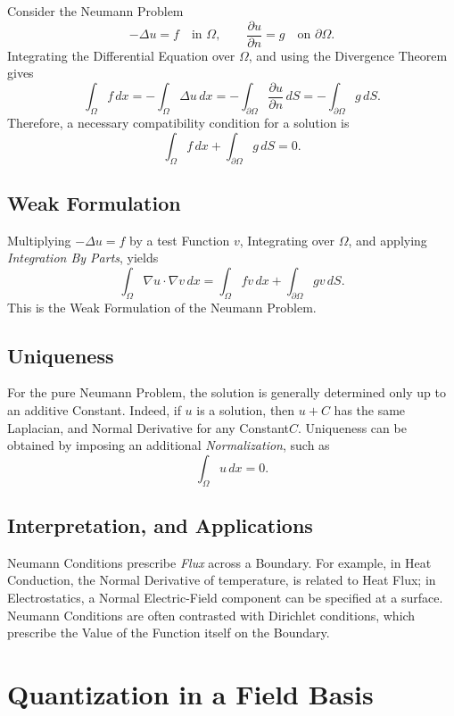 \documentclass[a4paper, 10pt, onepage]{elegantbook}
\begin{document}
Consider the Neumann Problem
\[
-\Delta u=f \quad \text{in } \Omega,
\qquad
\frac{\partial u}{\partial n}=g \quad \text{on } \partial\Omega.
\]
Integrating the Differential Equation over \(\Omega\), and using the
Divergence Theorem gives
\[
\int_\Omega f\,dx
=-\int_\Omega\Delta u\,dx
=-\int_{\partial\Omega}\frac{\partial u}{\partial n}\,dS
=-\int_{\partial\Omega}g\,dS.
\]
Therefore, a necessary compatibility condition for a solution is
\[
\boxed{
\int_\Omega f\,dx
+\int_{\partial\Omega}g\,dS=0
}.
\]

\subsection{Weak Formulation}

Multiplying \(-\Delta u=f\) by a test Function \(v\), Integrating over \(\Omega\), and applying \emph{Integration By Parts}, yields
\[
\int_\Omega \nabla u\cdot\nabla v\,dx
=
\int_\Omega f v\,dx
+\int_{\partial\Omega}g v\,dS.
\]
This is the Weak Formulation of the Neumann Problem.

\subsection{Uniqueness}

For the pure Neumann Problem, the solution is generally determined only up to an additive Constant. Indeed, if \(u\) is a solution, then
\(u+C\) has the same Laplacian, and Normal Derivative for any Constant\(C\). Uniqueness can be obtained by imposing an additional \emph{Normalization}, such as
\[
\int_\Omega u\,dx=0.
\]

\subsection{Interpretation, and Applications}

Neumann Conditions prescribe \emph{Flux} across a Boundary. For example, in Heat Conduction, the Normal Derivative of temperature, is related
to Heat Flux; in Electrostatics, a Normal Electric-Field component can be specified at a surface. Neumann Conditions are often contrasted with Dirichlet conditions, which prescribe the Value of the Function itself on the Boundary.












\section{Quantization in a Field Basis}
\end{document}
